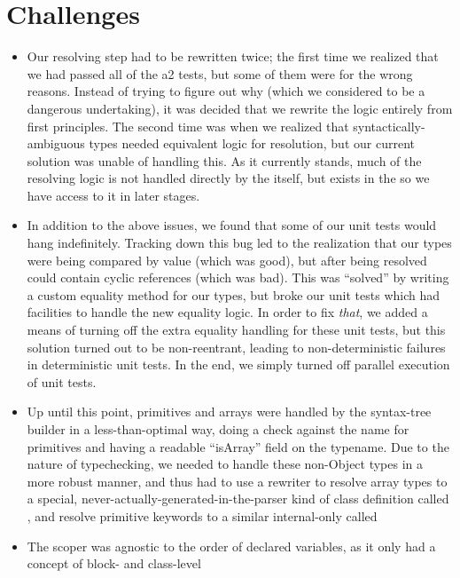 \documentclass{article}
\begin{document}
\section{Challenges}
\begin{itemize}
    \item Our resolving step had to be rewritten twice; the first time we realized that we had passed all of the a2
        tests, but some of them were for the wrong reasons. Instead of trying to figure out why (which we considered to
        be a dangerous undertaking), it was decided that we rewrite the logic entirely from first principles. The second
        time was when we realized that syntactically-ambiguous types needed equivalent logic for resolution, but our
        current solution was unable of handling this. As it currently stands, much of the resolving logic is not handled
        directly by the  itself, but exists in the  so we have access to it in later
        stages.
    \item In addition to the above issues, we found that some of our  unit tests would hang indefinitely.
        Tracking down this bug led to the realization that our types were being compared by value (which was good), but
        after being resolved could contain cyclic references (which was bad). This was ``solved'' by writing a custom
        equality method for our types, but broke our unit tests which had facilities to handle the new equality logic.
        In order to fix \textit{that}, we added a means of turning off the extra equality handling for these unit tests,
        but this solution turned out to be non-reentrant, leading to non-deterministic failures in deterministic unit
        tests. In the end, we simply turned off parallel execution of unit tests.
   \item Up until this point, primitives and arrays were handled by the syntax-tree builder in a less-than-optimal way,
         doing a check against the name for primitives and having a readable ``isArray'' field on the typename. Due to
         the nature of typechecking, we needed to handle these non-Object types in a more robust manner, and thus had to
         use a rewriter to resolve array types to a special, never-actually-generated-in-the-parser kind of class definition
         called , and resolve primitive keywords to a similar internal-only  called 
   \item The scoper was agnostic to the order of declared variables, as it only had a concept of block- and class-level

\end{itemize}
\end{document}
